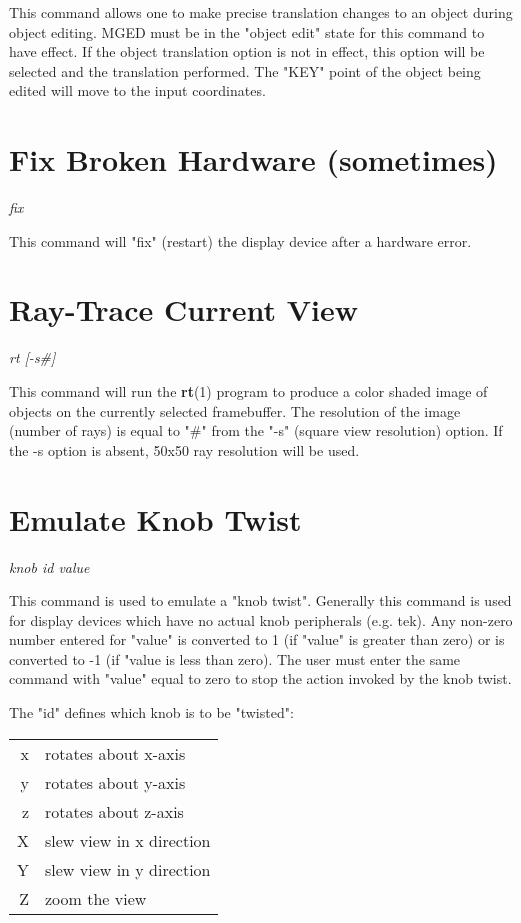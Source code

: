 This command allows one to make precise translation changes to an object
during object editing.
MGED must be in the "object edit" state for this command to have effect.
If the object translation option is not in effect, this option will be
selected and the translation performed.
The "KEY" point of the object being edited will move to the input coordinates.

\section{Fix Broken Hardware (sometimes)}

{\em \center
fix
}

This command will "fix" (restart) the display device after a hardware error.

\section{Ray-Trace Current View}

{\em \center
rt [-s\#]
}

This command will run the {\bf rt}(1) program
to produce a color shaded image of objects on the currently
selected framebuffer.
The resolution of the image (number of rays) is equal to "\#" from the "-s"
(square view resolution) option.
If the -s option is absent, 50x50 ray resolution will be used.

\section{Emulate Knob Twist}

{\em \center
knob id value
}

This command is used to emulate a "knob twist".
Generally this command is used for display devices which have no actual
knob peripherals (e.g. tek).
Any non-zero number entered for "value" is converted to 1 (if "value" is
greater than zero) or is converted to -1 (if "value is less than zero).
The user must enter the same command with "value" equal to zero to
stop the action invoked by the knob twist.

The "id" defines which knob is to be "twisted":

\begin{tabular}{rl}
	x	& rotates about x-axis \\
	y	& rotates about y-axis \\
	z	& rotates about z-axis \\
	X	& slew view in x direction \\
	Y	& slew view in y direction \\
	Z	& zoom the view \\
\end{tabular}

